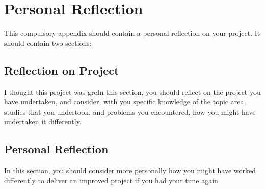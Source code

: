 %
%

\chapter{Personal Reflection}

This compulsory appendix should contain a personal reflection on your project.
It should contain two sections:

\section{Reflection on Project}

I thought this project was greIn this section, you should reflect on the
project you have undertaken, and consider, with you specific knowledge of the
topic area, studies that you undertook, and problems you encountered, how you
might have undertaken it differently.

\section{Personal Reflection}

In this section, you should consider more personally how you might have worked
differently to deliver an improved project if you had your time again.

